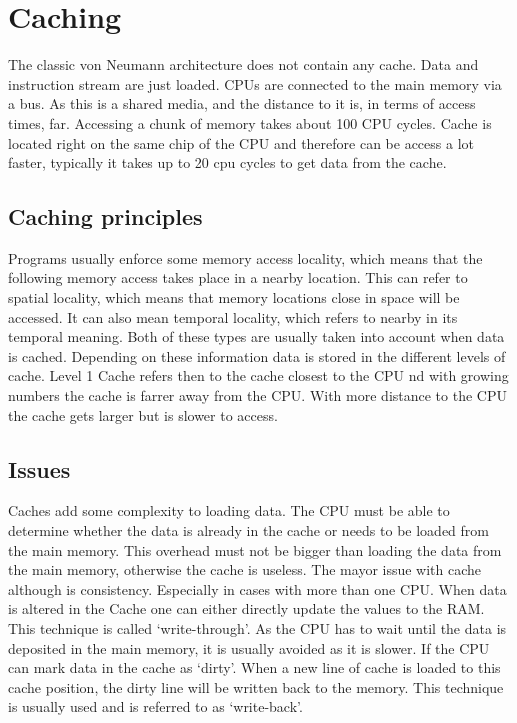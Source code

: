 \documentclass{article}
\begin{document}
\section{Caching} %
\label{sec:caching}
The classic von Neumann architecture does not contain any cache.
Data and instruction stream are just loaded.
CPUs are connected to the main memory via a bus.
As this is a shared media, and the distance to it is,
in terms of access times, far.
Accessing a chunk of memory takes about 100 CPU cycles.
Cache is located right on the same chip of the CPU and therefore can be access a lot faster,
typically it takes up to 20 cpu cycles to get data from the cache.

\subsection{Caching principles} %
\label{sub:caching_principles}
	Programs usually enforce some memory access locality,
	which means that the following memory access takes place in a nearby location. 
	This can refer to spatial locality,
	which means that memory locations close in space will be accessed.
	It can also mean temporal locality, which refers to nearby in its temporal meaning.
	Both of these types are usually taken into account when data is cached.
	Depending on these information data is stored in the different levels of cache.
	Level 1 Cache refers then to the cache closest to the CPU 
	nd with growing numbers the cache is farrer away from the CPU.
	With more distance to the CPU the cache gets larger but is slower to access.

\subsection{Issues} %
\label{sub:issues}
	Caches add some complexity to loading data.
	The CPU must be able to determine whether the data is already in the cache
	or needs to be loaded from the main memory.
	This overhead must not be bigger than loading the data from the main memory,
	otherwise the cache is useless.
	The mayor issue with cache although is consistency.
	Especially in cases with more than one CPU.
	When data is altered in the Cache one can either directly update the values to the RAM.
	This technique is called ‘write-through’.
	As the CPU has to wait until the data is deposited in the main memory,
	it is usually avoided as it is slower.
	If the CPU can mark data in the cache as ‘dirty’.
	When a new line of cache is loaded to this cache position,
	the dirty line will be written back to the memory.
	This technique is usually used and is referred to as ‘write-back’.
\end{document}
